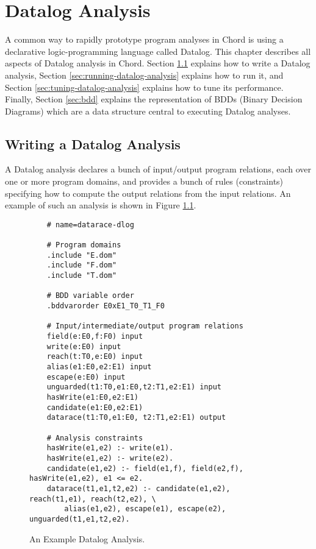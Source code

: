 \chapter{Datalog Analysis}
\label{chap:datalog-analysis}

A common way to rapidly prototype program analyses in Chord is using a declarative
logic-programming language called Datalog.  This chapter describes all aspects of
Datalog analysis in Chord.
Section \ref{sec:writing-datalog-analysis} explains how to write a Datalog analysis,
Section \ref{sec:running-datalog-analysis} explains how to run it, and
Section \ref{sec:tuning-datalog-analysis} explains how to tune its performance.
Finally, Section \ref{sec:bdd} explains the representation of BDDs (Binary Decision Diagrams)
which are a data structure central to executing Datalog analyses.

\section{Writing a Datalog Analysis}
\label{sec:writing-datalog-analysis}

A Datalog analysis declares a bunch of input/output program relations,
each over one or more program domains, and provides a bunch of rules (constraints)
specifying how to compute the output relations from the input relations.
An example of such an analysis is shown in Figure \ref{fig:datalog-analysis}.

\begin{figure}
{\small
\begin{verbatim}
    # name=datarace-dlog

    # Program domains
    .include "E.dom"
    .include "F.dom"
    .include "T.dom"

    # BDD variable order
    .bddvarorder E0xE1_T0_T1_F0

    # Input/intermediate/output program relations
    field(e:E0,f:F0) input
    write(e:E0) input
    reach(t:T0,e:E0) input
    alias(e1:E0,e2:E1) input
    escape(e:E0) input
    unguarded(t1:T0,e1:E0,t2:T1,e2:E1) input
    hasWrite(e1:E0,e2:E1)
    candidate(e1:E0,e2:E1) 
    datarace(t1:T0,e1:E0, t2:T1,e2:E1) output

    # Analysis constraints
    hasWrite(e1,e2) :- write(e1).
    hasWrite(e1,e2) :- write(e2).
    candidate(e1,e2) :- field(e1,f), field(e2,f), hasWrite(e1,e2), e1 <= e2.
    datarace(t1,e1,t2,e2) :- candidate(e1,e2), reach(t1,e1), reach(t2,e2), \
        alias(e1,e2), escape(e1), escape(e2), unguarded(t1,e1,t2,e2).
\end{verbatim}
}
\label{fig:datalog-analysis}
\caption{An Example Datalog Analysis.}
\end{figure}

